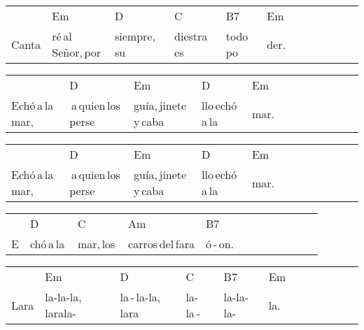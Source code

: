 \begin{multicols}{2}
\begin{minipage}{\columnwidth}
\noindent
\begin{tabular}{llllllllllll}
&Em&D&C&B7&Em\\
Canta&ré\,al\,Señor,\,por\,&siempre,\,su\,&diestra\,es\,&todo\,po&der.
\end{tabular}

\noindent
\begin{tabular}{llllllllllll}
&D&Em&D&Em\\
Echó\,a\,la\,mar,\,&\,a\,quien\,los\,perse&guía,\,jinete\,y\,caba&llo\,echó\,a\,la\,&mar.
\end{tabular}

\noindent
\begin{tabular}{llllllllllll}
&D&Em&D&Em\\
Echó\,a\,la\,mar,\,&\,a\,quien\,los\,perse&guía,\,jinete\,y\,caba&llo\,echó\,a\,la\,&mar.
\end{tabular}

\noindent
\begin{tabular}{llllllllllll}
&D&C&Am&B7\\
E&chó\,a\,la\,&mar,\,los\,&carros\,del\,fara&ó\,-\,on.
\end{tabular}

\noindent
\begin{tabular}{llllllllllll}
&Em&D&C&B7&Em\\
Lara&la-la-la,\,larala-&la\,-\,la-la,\,lara&la-la\,-\,&la-la-la-&la.
\end{tabular}
\end{minipage}\\

\end{multicols}